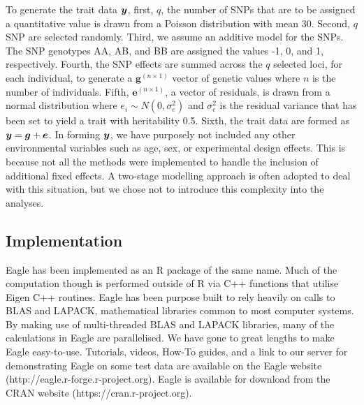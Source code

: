 \documentclass{nature}
\begin{document}
To generate the trait data $\bm{y}$, first, $q$, the number of SNPs that are to be assigned a quantitative value is drawn from a Poisson distribution with 
mean 30. Second, $q$ SNP are selected randomly. Third, we assume an additive model for the SNPs. The SNP genotypes AA, AB, and BB 
are assigned the values -1, 0, and 1, respectively. Fourth, the SNP effects are summed across the $q$ selected loci, for each individual, to 
generate a $\bm{g}^{(n \times 1)}$ vector of genetic values where $n$ is the number of individuals. 
Fifth, $\bm{e}^{(n \times 1)}$, a vector of residuals, is drawn from a normal distribution where $e_i \sim N(0, \sigma^2_e)$ and $\sigma^2_e$ is 
the residual variance that has been set to yield a trait with heritability 0.5. Sixth,  the trait data are formed as $\bm{y} =  \bm{g} + \bm{e}$.  
In forming $\bm{y}$, we have purposely not included any other environmental variables such as age, sex, or experimental design effects. This is because 
not all the methods were implemented to handle the inclusion of additional fixed effects. A two-stage modelling approach 
is often adopted to deal with this situation, but we chose not to introduce this complexity into the analyses.  



\subsection{Implementation}

Eagle has been implemented as an R package of the same name. Much of the computation though is performed outside of R 
via C++ functions that utilise Eigen C++ routines. Eagle has been purpose built to rely heavily on calls to BLAS and LAPACK, 
mathematical libraries common to most computer systems. By making use of multi-threaded  BLAS and LAPACK libraries, many of the 
calculations in Eagle are parallelised. We have gone to great lengths to make Eagle easy-to-use. Tutorials, videos, How-To guides, and 
a link to our server for demonstrating Eagle on some test data are available on the Eagle website (http://eagle.r-forge.r-project.org).  
Eagle is available for download from the CRAN website (https://cran.r-project.org). 

  
 






\end{document}
